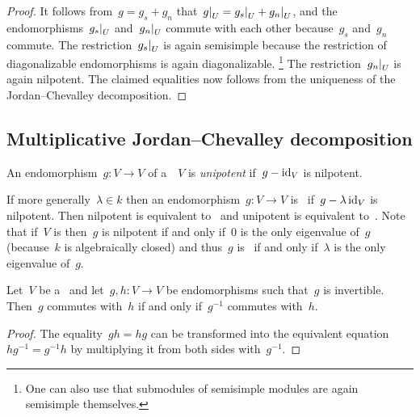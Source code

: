 \begin{proof}
  It follows from~$g = g_s + g_n$ that~$\restrict{g}{U} = \restrict{g_s}{U} + \restrict{g_n}{U}$, and the endomorphisms~$\restrict{g_s}{U}$ and~$\restrict{g_n}{U}$ commute with each other because~$g_s$ and~$g_n$ commute.
  The restriction~$\restrict{g_s}{U}$ is again semisimple because the restriction of diagonalizable endomorphisms is again diagonalizable.%
  \footnote{One can also use that submodules of semisimple modules are again semisimple themselves.}
  The restriction~$\restrict{g_n}{U}$ is again nilpotent.
  The claimed equalities now follows from the uniqueness of the Jordan\nobreakdash--Chevalley decomposition.
\end{proof}






\subsection{Multiplicative Jordan--Chevalley decomposition}


\begin{definition}
  An endomorphism~$g \colon V \to V$ of a~~$V$ is \emph{unipotent} if~$g - \operatorname{id}_V$ is nilpotent.
\end{definition}


\begin{remark}
  If more generally~$\lambda \in k$ then an endomorphism~$g \colon V \to V$ is~\emph{} if~$g - \lambda \operatorname{id}_V$ is nilpotent.
  Then nilpotent is equivalent to~ and unipotent is equivalent to~.
  Note that if~$V$ is  then~$g$ is nilpotent if and only if~$0$ is the only eigenvalue of~$g$ (because~$k$ is algebraically closed) and thus~$g$ is~ if and only if~$\lambda$ is the only eigenvalue of~$g$.
\end{remark}


\begin{lemma}
  Let~$V$ be a~ and let~$g, h \colon V \to V$ be endomorphisms such that~$g$ is invertible.
  Then~$g$ commutes with~$h$ if and only if~$g^{-1}$ commutes with~$h$.
\end{lemma}


\begin{proof}
  The equality~$g h = h g$ can be transformed into the equivalent equation~$h g^{-1} = g^{-1} h$ by multiplying it from both sides with~$g^{-1}$.
\end{proof}


